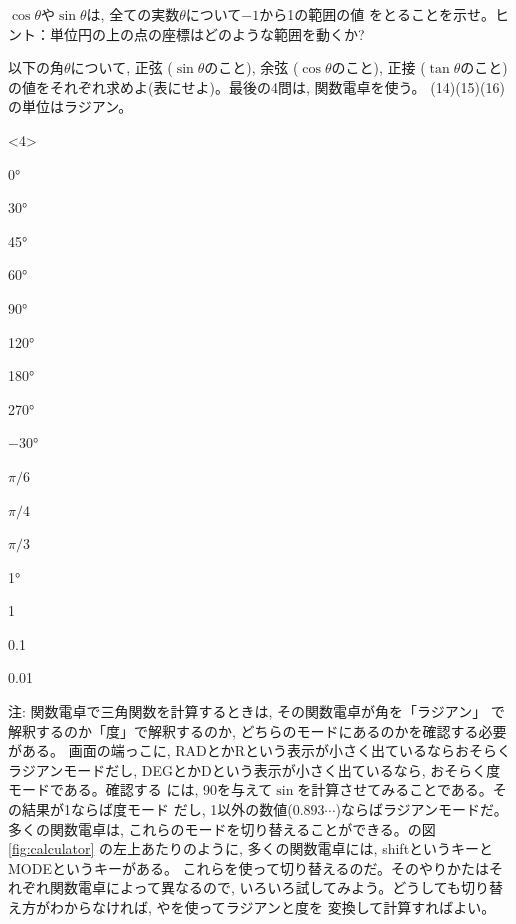 \begin{q}\label{q:trig_sincos2} 
$\cos \theta$や$\sin \theta$は, 全ての実数$\theta$について$-1$から1の範囲の値
をとることを示せ。ヒント：単位円の上の点の座標はどのような範囲を動くか? \end{q}

\begin{q}\label{q:trig_sincos6} 
以下の角$\theta$について, 正弦 ($\sin \theta$のこと), 余弦
 ($\cos \theta$のこと), 正接 
($\tan \theta$のこと)の値をそれぞれ求めよ(表にせよ)。最後の4問は, 関数電卓を使う。
(14)(15)(16)の単位はラジアン。
\begin{edaenumerate}<4>
\item 0°
\item 30°
\item 45°
\item 60°
\item 90°
\item 120°
\item 180°
\item 270°
\item $-30$°
\item $\pi/6$
\item $\pi/4$
\item $\pi/3$
\item 1°
\item 1
\item 0.1
\item 0.01
\end{edaenumerate}\end{q}
{\small 注: 関数電卓で三角関数を計算するときは, その関数電卓が角を「ラジアン」
で解釈するのか「度」で解釈するのか, どちらのモードにあるのかを確認する必要がある。
画面の端っこに, RADとかRという表示が小さく出ているならおそらくラジアンモードだし, 
DEGとかDという表示が小さく出ているなら, おそらく度モードである。確認する
には, 90を与えて$\sin$を計算させてみることである。その結果が1ならば度モード
だし, 1以外の数値($0.893\cdots$)ならばラジアンモードだ。多くの関数電卓は, 
これらのモードを切り替えることができる。の図\ref{fig:calculator}
の左上あたりのように, 多くの関数電卓には, shiftというキーとMODEというキーがある。
これらを使って切り替えるのだ。そのやりかたはそれぞれ関数電卓によって異なるので, 
いろいろ試してみよう。どうしても切り替え方がわからなければ, 
やを使ってラジアンと度を
変換して計算すればよい。}
\mv

